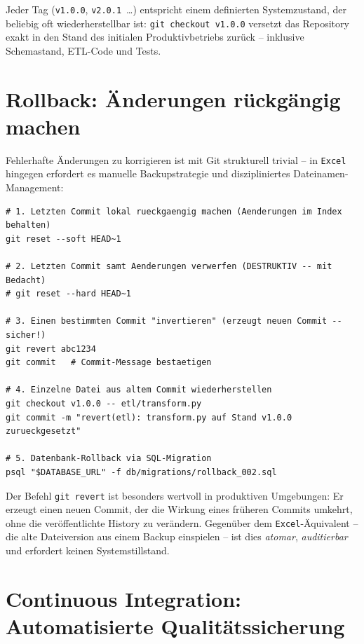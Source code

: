 ﻿\documentclass[12pt,a4paper]{report}
\theoremstyle{definition}
\theoremstyle{remark}
\newcommand{\excel}{\texttt{Excel}}
\newcommand{\code}[1]{\texttt{#1}}
\begin{document}
Jeder Tag (\code{v1.0.0}, \code{v2.0.1}~\ldots) entspricht einem
definierten Systemzustand, der beliebig oft wiederherstellbar ist:
\code{git checkout v1.0.0} versetzt das Repository exakt in den
Stand des initialen Produktivbetriebs zurück -- inklusive Schemastand,
ETL-Code und Tests.

\section{Rollback: Änderungen rückgängig machen}

Fehlerhafte Änderungen zu korrigieren ist mit Git strukturell trivial --
in \excel{} hingegen erfordert es manuelle Backupstrategie und
diszipliniertes Dateinamen-Management:

\begin{lstlisting}[style=bash, caption={Rollback-Szenarien mit Git}]
# 1. Letzten Commit lokal rueckgaengig machen (Aenderungen im Index behalten)
git reset --soft HEAD~1

# 2. Letzten Commit samt Aenderungen verwerfen (DESTRUKTIV -- mit Bedacht)
# git reset --hard HEAD~1

# 3. Einen bestimmten Commit "invertieren" (erzeugt neuen Commit -- sicher!)
git revert abc1234
git commit   # Commit-Message bestaetigen

# 4. Einzelne Datei aus altem Commit wiederherstellen
git checkout v1.0.0 -- etl/transform.py
git commit -m "revert(etl): transform.py auf Stand v1.0.0 zurueckgesetzt"

# 5. Datenbank-Rollback via SQL-Migration
psql "$DATABASE_URL" -f db/migrations/rollback_002.sql
\end{lstlisting}

Der Befehl \code{git revert} ist besonders wertvoll in produktiven Umgebungen:
Er erzeugt einen neuen Commit, der die Wirkung eines früheren Commits
umkehrt, ohne die veröffentlichte History zu verändern.
Gegenüber dem \excel-Äquivalent -- die alte Dateiversion aus einem
Backup einspielen -- ist dies \emph{atomar}, \emph{auditierbar} und
erfordert keinen Systemstillstand.

\section{Continuous Integration: Automatisierte Qualitätssicherung}
\end{document}
